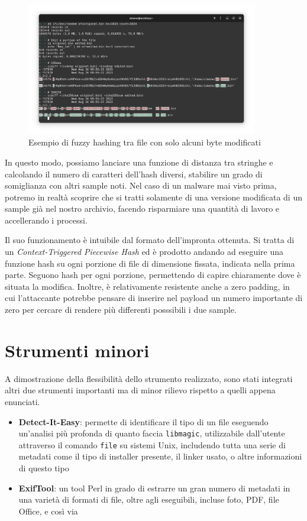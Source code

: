 \begin{figure}[htbp]
    \centering
    \includegraphics[width=0.9\textwidth]{assets/ssdeep_demo_run.png}
    \caption{Esempio di fuzzy hashing tra file con solo alcuni byte modificati}
    \label{fig:ssdeep_demo_run}
\end{figure}

In questo modo, possiamo lanciare una funzione di distanza tra stringhe e calcolando il numero di caratteri dell'hash diversi, stabilire un grado di somiglianza con altri sample noti. Nel caso di un malware mai visto prima, potremo in realtà scoprire che si tratti solamente di una versione modificata di un sample già nel nostro archivio, facendo risparmiare una quantità di lavoro e accellerando i processi.

Il suo funzionamento è intuibile dal formato dell'impronta ottenuta. Si tratta di un \emph{Context-Triggered Piecewise Hash} ed è prodotto andando ad eseguire una funzione hash su ogni porzione di file di dimensione fissata, indicata nella prima parte. Seguono hash per ogni porzione, permettendo di capire chiaramente dove è situata la modifica. Inoltre, è relativamente resistente anche a zero padding, in cui l'attaccante potrebbe pensare di inserire nel payload un numero importante di zero per cercare di rendere più differenti posssibili i due sample.

\section{Strumenti minori}
A dimostrazione della flessibilità dello strumento realizzato, sono stati integrati altri due strumenti importanti ma di minor rilievo rispetto a quelli appena enunciati.

\begin{itemize}
    \item \textbf{Detect-It-Easy}: permette di identificare il tipo di un file eseguendo un'analisi più profonda di quanto faccia \texttt{libmagic}, utilizzabile dall'utente attraverso il comando \texttt{file} su sistemi Unix, includendo tutta una serie di metadati come il tipo di installer presente, il linker usato, o altre informazioni di questo tipo
    \item \textbf{ExifTool}: un tool Perl in grado di estrarre un gran numero di metadati in una varietà di formati di file, oltre agli eseguibili, incluse foto, PDF, file Office, e così via
\end{itemize}

